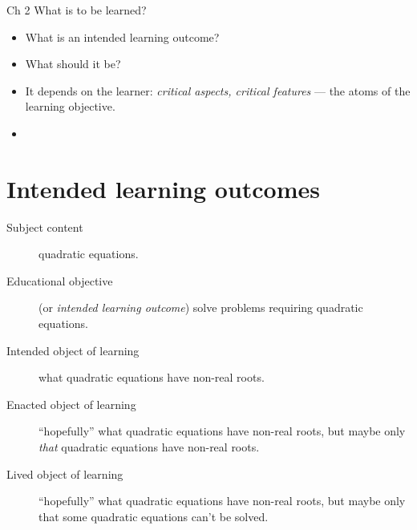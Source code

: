 \begin{frame}
  \begin{block}{Ch 2 What is to be learned?}
    \begin{itemize}
      \item What is an intended learning outcome?
      \item What should it be?
      \item It depends on the learner: \emph{critical aspects, critical 
        features} --- the atoms of the learning objective.
    \end{itemize}
  \end{block}
  
  \pause

  \begin{remark}
    \begin{itemize}
      \item {}
    \end{itemize}
  \end{remark}
\end{frame}

\section{Intended learning outcomes}

\begin{frame}
  \begin{example}
    \begin{description}
      \item[Subject content] \eg
        quadratic equations.

      \item[Educational objective] (or \emph{intended learning outcome}) \eg
        solve problems requiring quadratic equations.

      \item[Intended object of learning] \eg
        what quadratic equations have non-real roots.

      \item[Enacted object of learning] \eg
        \enquote{hopefully} what quadratic equations have non-real roots,
        but maybe only \emph{that} quadratic equations have non-real roots.

      \item[Lived object of learning] \eg
        \enquote{hopefully} what quadratic equations have non-real roots,
        but maybe only that some quadratic equations can't be solved.
    \end{description}
  \end{example}
\end{frame}

